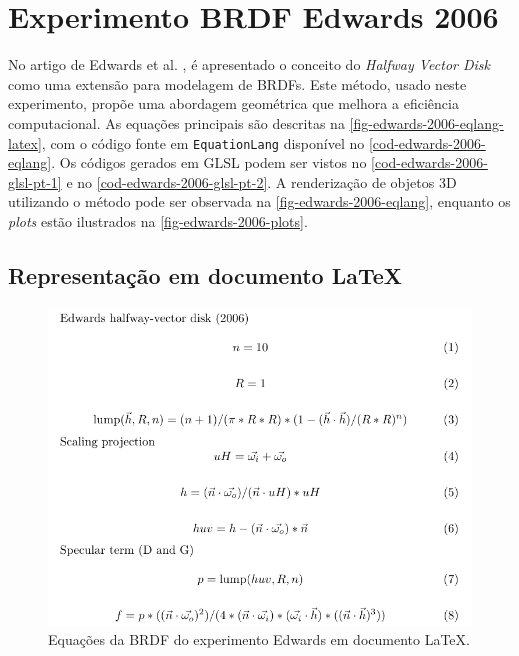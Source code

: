 \section{Experimento BRDF Edwards 2006}

No artigo de Edwards et al. \cite{edwards2006halfway}, é apresentado o conceito do \textit{Halfway Vector Disk} como uma extensão para modelagem de BRDFs. Este método, usado neste experimento, propõe uma abordagem geométrica que melhora a eficiência computacional. As equações principais são descritas na \autoref{fig-edwards-2006-eqlang-latex}, com o código fonte em \texttt{EquationLang} disponível no \autoref{cod-edwards-2006-eqlang}. Os códigos gerados em GLSL podem ser vistos no \autoref{cod-edwards-2006-glsl-pt-1} e no \autoref{cod-edwards-2006-glsl-pt-2}. A renderização de objetos 3D utilizando o método pode ser observada na \autoref{fig-edwards-2006-eqlang}, enquanto os \textit{plots} estão ilustrados na \autoref{fig-edwards-2006-plots}.

\subsection{Representação em documento \LaTeX{}}
\begin{figure}[H]
    \caption{\label{fig-edwards-2006-eqlang-latex} \small Equações da BRDF do experimento Edwards em documento \LaTeX{}.}
    \begin{center}
        \includegraphics[scale=0.92]{./Imagens/brdfs/edwards-2006.pdf}
    \end{center}
\end{figure}

